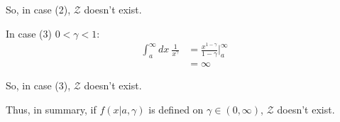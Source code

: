 So, in case (2), $\mathcal{Z}$ doesn't exist.

In case (3) $0<\gamma<1$:
\begin{align*}
    \int_a^{\infty} dx\ \frac{1}{x^{\gamma}}
    &= \frac{x^{1-\gamma}}{1-\gamma} \biggr\rvert _a^{\infty} \\
    &= \infty    
\end{align*}

So, in case (3), $\mathcal{Z}$ doesn't exist.

Thus, in summary, if $f(x|a,\gamma)$ is defined on $\gamma \in (0, \infty)$, $\mathcal{Z}$ doesn't exist.


